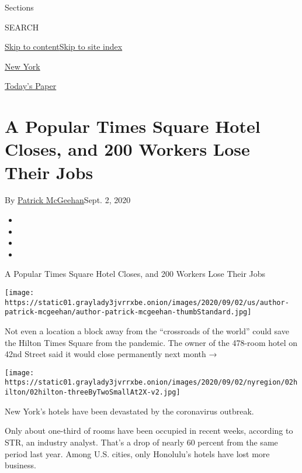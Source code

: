 Sections

SEARCH

\protect\hyperlink{site-content}{Skip to
content}\protect\hyperlink{site-index}{Skip to site index}

\href{https://www.nytimes3xbfgragh.onion/section/nyregion}{New York}

\href{https://myaccount.nytimes3xbfgragh.onion/auth/login?response_type=cookie\&client_id=vi}{}

\href{https://www.nytimes3xbfgragh.onion/section/todayspaper}{Today's
Paper}

\hypertarget{a-popular-times-square-hotel-closes-and-200-workers-lose-their-jobs}{%
\section{A Popular Times Square Hotel Closes, and 200 Workers Lose Their
Jobs}\label{a-popular-times-square-hotel-closes-and-200-workers-lose-their-jobs}}

By \href{https://www.nytimes3xbfgragh.onion/by/patrick-mcgeehan}{Patrick
McGeehan}Sept. 2, 2020

\begin{itemize}
\item
\item
\item
\item
\end{itemize}

A Popular Times Square Hotel Closes, and 200 Workers Lose Their Jobs

\texttt{[image: https://static01.graylady3jvrrxbe.onion/images/2020/09/02/us/author-patrick-mcgeehan/author-patrick-mcgeehan-thumbStandard.jpg]}

Not even a location a block away from the ``crossroads of the world''
could save the Hilton Times Square from the pandemic. The owner of the
478-room hotel on 42nd Street said it would close permanently next month
→

\texttt{[image: https://static01.graylady3jvrrxbe.onion/images/2020/09/02/nyregion/02hilton/02hilton-threeByTwoSmallAt2X-v2.jpg]}

New York's hotels have been devastated by the coronavirus outbreak.

Only about one-third of rooms have been occupied in recent weeks,
according to STR, an industry analyst. That's a drop of nearly 60
percent from the same period last year. Among U.S. cities, only
Honolulu's hotels have lost more business.

